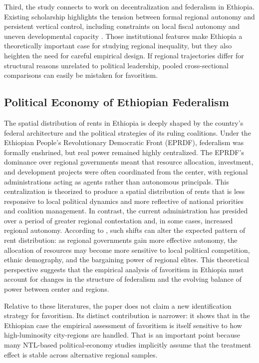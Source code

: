 \documentclass[12pt,a4paper]{article}
\begin{document}
Third, the study connects to work on decentralization and federalism in Ethiopia. Existing scholarship highlights the tension between formal regional autonomy and persistent vertical control, including constraints on local fiscal autonomy and uneven developmental capacity \citep{Faguet2021,Wubneh2017}. Those institutional features make Ethiopia a theoretically important case for studying regional inequality, but they also heighten the need for careful empirical design. If regional trajectories differ for structural reasons unrelated to political leadership, pooled cross-sectional comparisons can easily be mistaken for favoritism.

\subsection*{Political Economy of Ethiopian Federalism}
The spatial distribution of rents in Ethiopia is deeply shaped by the country’s federal architecture and the political strategies of its ruling coalitions. Under the Ethiopian People’s Revolutionary Democratic Front (EPRDF), federalism was formally enshrined, but real power remained highly centralized. The EPRDF’s dominance over regional governments meant that resource allocation, investment, and development projects were often coordinated from the center, with regional administrations acting as agents rather than autonomous principals. This centralization is theorized to produce a spatial distribution of rents that is less responsive to local political dynamics and more reflective of national priorities and coalition management. In contrast, the current administration has presided over a period of greater regional contestation and, in some cases, increased regional autonomy. According to \citet{Faguet2021}, such shifts can alter the expected pattern of rent distribution: as regional governments gain more effective autonomy, the allocation of resources may become more sensitive to local political competition, ethnic demography, and the bargaining power of regional elites. This theoretical perspective suggests that the empirical analysis of favoritism in Ethiopia must account for changes in the structure of federalism and the evolving balance of power between center and regions.

Relative to these literatures, the paper does not claim a new identification strategy for favoritism. Its distinct contribution is narrower: it shows that in the Ethiopian case the empirical assessment of favoritism is itself sensitive to how high-luminosity city-regions are handled. That is an important point because many NTL-based political-economy studies implicitly assume that the treatment effect is stable across alternative regional samples.
\end{document}
